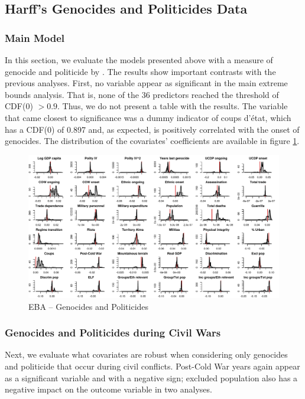 \subsection{Harff's Genocides and Politicides Data}
\label{sec:harff}

\subsubsection{Main Model}

In this section, we evaluate the models presented above with a measure of genocide and politicide by \citet{harff2003no}. The results show important contrasts with the previous analyses. First, no variable appear as significant in the main extreme bounds analysis. That is, none of the 36 predictors reached the threshold of CDF(0) $> 0.9$. Thus, we do not present a table with the results. The variable that came closest to significance was a dummy indicator of coups d'état, which has a CDF(0) of 0.897 and, as expected, is positively correlated with the onset of genocides. The distribution of the covariates' coefficients are available in figure \ref{fig:uamk}.

\newpage 

\clearpage
\begin{figure}
    \centering
    \includegraphics[width=\textwidth]{images/uamk.pdf}
    \caption{EBA -- Genocides and Politicides}
    \label{fig:uamk}
\end{figure}
\clearpage

\subsubsection{Genocides and Politicides during Civil Wars}

Next, we evaluate what covariates are robust when considering only genocides and politicide that occur during civil conflicts. Post-Cold War years again appear as a significant variable and with a negative sign; excluded population also has a negative impact on the outcome variable in two analyses.

